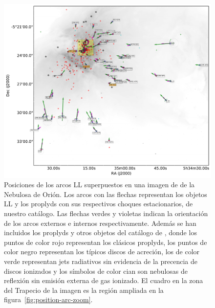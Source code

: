 \begin{figure}
  \centering
  \includegraphics[width=\linewidth]{ll-pos-image}
  \caption{Posiciones de los arcos LL superpuestos en una imagen de \ha{} de la Nebulosa de Orión. Los arcos con las flechas representan los objetos LL y los proplyds con sus respectivos choques estacionarios, de nuestro catálogo. Las flechas verdes y violetas indican la orientación de los arcos externos e internos respectivamente. Además se han incluidos los proplyds y otros objetos del catálogo de \citet{Ricci:2008}, donde los puntos de color rojo representan los clásicos proplyds, los puntos de color negro representan los típicos discos de acreción, los de color verde representan jets radiativos sin evidencia de la precencia de discos ionizados y los símbolos de color cian son nebulosas de reflexión sin emisión externa de gas ionizado. El cuadro en la zona del Trapecio de la imagen es la región ampliada en la figura~\ref{fig:position-arc-zoom}.}
  \label{fig:position-arc}
\end{figure}

